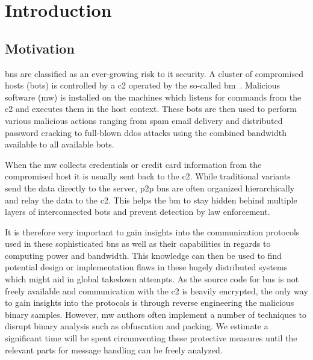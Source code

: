 \chapter{Introduction\label{ch:Introduction}}


\section{Motivation\label{sec:Introduction::Motivation}}
\Glspl{bn} are classified as an ever-growing risk to \acrshort{it} security.
A cluster of compromised hosts (\glspl{bot}) is controlled by a \gls{c2} operated by the so-called \gls{bm}~\cite{aburajab2006multifaceted}.
Malicious software (\gls{mw}) is installed on the machines which listens for commands from the \gls{c2} and executes them in the host context.
These \glspl{bot} are then used to perform various malicious actions ranging from spam email delivery and distributed password cracking to full-blown \gls{ddos} attacks using the combined bandwidth available to all available \glspl{bot}.

When the \gls{mw} collects credentials or credit card information from the compromised host it is usually sent back to the \gls{c2}.
While traditional variants send the data directly to the server, \gls{p2p} \glspl{bn} are often organized hierarchically and relay the data to the \gls{c2}.
This helps the \gls{bm} to stay hidden behind multiple layers of interconnected \glspl{bot} and prevent detection by law enforcement.

It is therefore very important to gain insights into the communication protocols used in these sophisticated \glspl{bn} as well as their capabilities in regards to computing power and bandwidth.
This knowledge can then be used to find potential design or implementation flaws in these hugely distributed systems which might aid in global takedown attempts.
As the source code for \glspl{bn} is not freely available and communication with the \gls{c2} is heavily encrypted, the only way to gain insights into the protocols is through reverse engineering the malicious binary samples.
However, \gls{mw} authors often implement a number of techniques to disrupt binary analysis such as obfuscation and packing.
We estimate a significant time will be spent circumventing these protective measures until the relevant parts for message handling can be freely analyzed.

